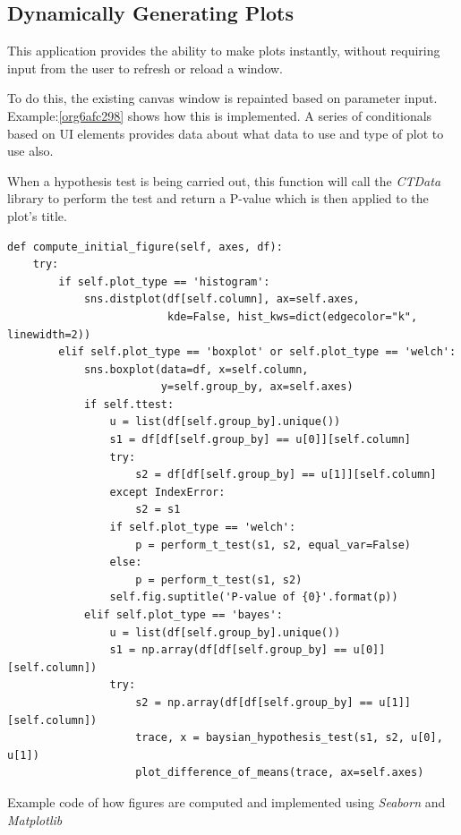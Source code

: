 \documentclass[11pt]{report}
\begin{document}
\subsection{Dynamically Generating Plots}
\label{sec:org42f2540}
This application provides the ability to make plots instantly, without requiring input from the user to refresh or reload a window.

To do this, the existing canvas window is repainted based on parameter input. Example:\ref{org6afc298}
shows how this is implemented. A series of conditionals based on UI elements provides data about what data to use and type of plot to use also.

When a hypothesis test is being carried out, this function will call the \emph{CTData} library to perform the test and return a P-value which is then applied to the plot's title.

\begin{listing}[htbp]
\begin{verbatim}
def compute_initial_figure(self, axes, df):
    try:
        if self.plot_type == 'histogram':
            sns.distplot(df[self.column], ax=self.axes,
                         kde=False, hist_kws=dict(edgecolor="k", linewidth=2))
        elif self.plot_type == 'boxplot' or self.plot_type == 'welch':
            sns.boxplot(data=df, x=self.column,
                        y=self.group_by, ax=self.axes)
            if self.ttest:
                u = list(df[self.group_by].unique())
                s1 = df[df[self.group_by] == u[0]][self.column]
                try:
                    s2 = df[df[self.group_by] == u[1]][self.column]
                except IndexError:
                    s2 = s1
                if self.plot_type == 'welch':
                    p = perform_t_test(s1, s2, equal_var=False)
                else:
                    p = perform_t_test(s1, s2)
                self.fig.suptitle('P-value of {0}'.format(p))
            elif self.plot_type == 'bayes':
                u = list(df[self.group_by].unique())
                s1 = np.array(df[df[self.group_by] == u[0]][self.column])
                try:
                    s2 = np.array(df[df[self.group_by] == u[1]][self.column])
                    trace, x = baysian_hypothesis_test(s1, s2, u[0], u[1])
                    plot_difference_of_means(trace, ax=self.axes)
\end{verbatim}
\caption{\label{org6afc298}
Example code of how figures are computed and implemented using \emph{Seaborn} and \emph{Matplotlib}}
\end{listing}
\end{document}
